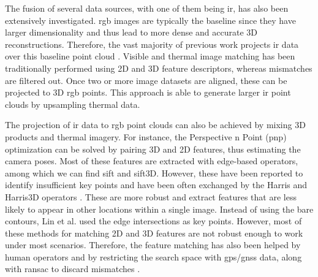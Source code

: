 The fusion of several data sources, with one of them being \acrshort{ir}, has also been extensively investigated. \acrshort{rgb} images are typically the baseline since they have larger dimensionality and thus lead to more dense and accurate 3D reconstructions. Therefore, the vast majority of previous work projects \acrshort{ir} data over this baseline point cloud  \cite{hosoi_estimating_2019, javadnejad_photogrammetric_2020}. Visible and thermal image matching has been traditionally performed using 2D and 3D feature descriptors, whereas mismatches are filtered out. Once two or more image datasets are aligned, these can be projected to 3D \acrshort{rgb} points. This approach is able to generate larger \acrshort{ir} point clouds by upsampling thermal data. 

The projection of \acrshort{ir} data to \acrshort{rgb} point clouds can also be achieved by mixing 3D products and thermal imagery. For instance, the Perspective n Point (\acrshort{pnp}) optimization can be solved by pairing 3D and 2D features, thus estimating the camera poses. Most of these features are extracted with edge-based operators, among which we can find \acrshort{sift} and \acrshort{sift}3D. However, these have been reported to identify insufficient key points and have been often exchanged by the Harris and Harris3D operators \cite{zhu_fusion_2021, zhu_direct_2019}. These are more robust and extract features that are less likely to appear in other locations within a single image. Instead of using the bare contours, Lin et al. \cite{lin_fusion_2019} used the edge intersections as key points. However, most of these methods for matching 2D and 3D features are not robust enough to work under most scenarios. Therefore, the feature matching has also been helped by human operators \cite{zhu_fusion_2021, zhu_direct_2019} and by restricting the search space with \acrshort{gps}/\acrshort{gnss} data, along with \acrshort{ransac} to discard mismatches \cite{lin_fusion_2019}. 

